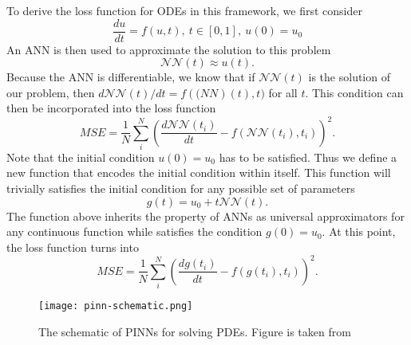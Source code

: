 To derive the loss function for \glspl{ODE} in this framework, we first consider
\begin{equation*}
    \frac{du}{dt} = f(u, t),\ t \in [0, 1],\ u(0) = u_0
\end{equation*}
An \gls{ANN} is then used to approximate the solution to this problem
\begin{equation*}
    \mathcal{NN}(t) \approx u(t).
\end{equation*}
Because the \gls{ANN} is differentiable, we know that if $\mathcal{NN}(t)$ is the solution of our problem, then $d\mathcal{NN}(t)/dt = f(\mathcal(NN)(t), t)$ for all $t$.
This condition can then be incorporated into the loss function
\begin{equation*}
    MSE = \frac{1}{N} \sum_i^N \left( \frac{d\mathcal{NN}(t_i)}{dt} - f(\mathcal{NN}(t_i), t_i) \right)^2.
\end{equation*}
Note that the initial condition $u(0) = u_0$ has to be satisfied.
Thus we define a new function that encodes the initial condition within itself. This function will trivially satisfies the initial condition for any possible set of parameters
\begin{equation*}
    g(t) = u_0 + t\mathcal{NN}(t).
\end{equation*}
The function above inherits the property of \glspl{ANN} as universal approximators for any continuous function while satisfies the condition $g(0) = u_0$.
At this point, the loss function turns into
\begin{equation*}
    MSE = \frac{1}{N} \sum_i^N \left( \frac{dg(t_i)}{dt} - f(g(t_i), t_i) \right)^2.
\end{equation*}

\begin{figure}[h]
    \centering
    \texttt{[image: pinn-schematic.png]}
    \caption{The schematic of PINNs for solving PDEs. Figure is taken from \citeauthor{guoSolvingPartialDifferential2020} \cite{guoSolvingPartialDifferential2020}}
    \label{fig:pinn-schematic}
\end{figure}

